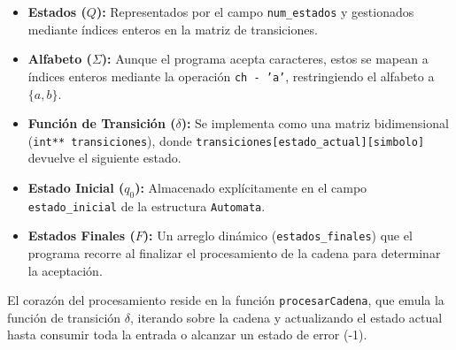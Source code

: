 \documentclass[letterpaper,11pt,twoside]{article}
\begin{document}
	\begin{itemize}
		\item \textbf{Estados ($Q$):} Representados por el campo \texttt{num\_estados} y gestionados mediante índices enteros en la matriz de transiciones.
		\item \textbf{Alfabeto ($\Sigma$):} Aunque el programa acepta caracteres, estos se mapean a índices enteros mediante la operación \texttt{ch - 'a'}, restringiendo el alfabeto a $\{a, b\}$.
		\item \textbf{Función de Transición ($\delta$):} Se implementa como una matriz bidimensional (\texttt{int** transiciones}), donde \texttt{transiciones[estado\_actual][simbolo]} devuelve el siguiente estado.
		\item \textbf{Estado Inicial ($q_0$):} Almacenado explícitamente en el campo \texttt{estado\_inicial} de la estructura \texttt{Automata}.
		\item \textbf{Estados Finales ($F$):} Un arreglo dinámico (\texttt{estados\_finales}) que el programa recorre al finalizar el procesamiento de la cadena para determinar la aceptación.
	\end{itemize}
	
	El corazón del procesamiento reside en la función \texttt{procesarCadena}, que emula la función de transición $\delta$, iterando sobre la cadena y actualizando el estado actual hasta consumir toda la entrada o alcanzar un estado de error (-1).
	
\end{document}
